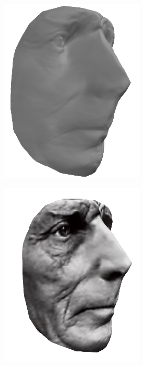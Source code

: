 \begin{figure}
\begin{subfigure}{0.32\textwidth}
        \includegraphics[width=0.8\textwidth]{statistical_normals/images/gsfs_results/celebrities/samuel_beckett_spherical.png}
\label{fig:samuel-beckett-no-texture}
    \end{subfigure}
    \begin{subfigure}{0.32\textwidth}
        \centering
        \includegraphics[width=0.8\textwidth]{statistical_normals/images/gsfs_results/celebrities/samuel_beckett_spherical_texture.png}

\end{subfigure}
\end{figure}
